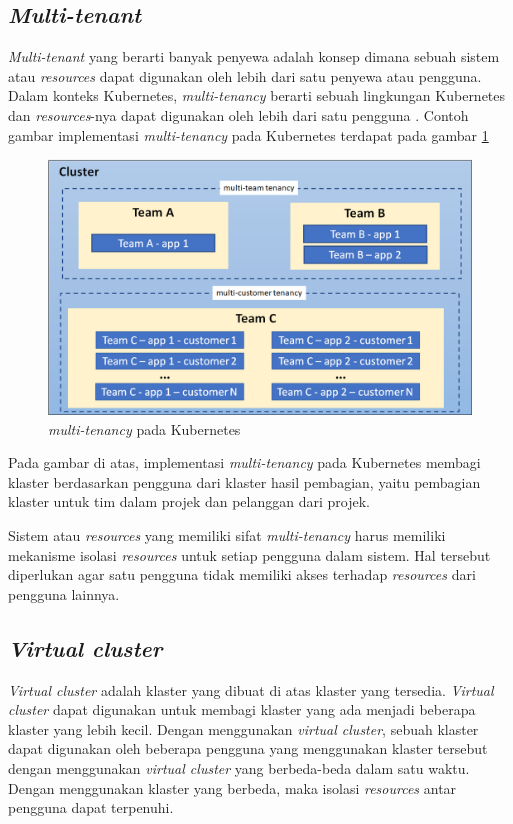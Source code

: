 \parencite{kubernetes-website-adding-linux-node}

\subsection{\emph{Multi-tenant}}

\emph{Multi-tenant} yang berarti banyak penyewa adalah konsep dimana sebuah sistem
atau \emph{resources} dapat digunakan oleh lebih dari satu penyewa atau pengguna. Dalam
konteks Kubernetes, \emph{multi-tenancy} berarti sebuah lingkungan Kubernetes dan \emph{resources}-nya
dapat digunakan oleh lebih dari satu pengguna \parencite{oliva_multi-tenancy_2024}. Contoh gambar
implementasi \emph{multi-tenancy} pada Kubernetes terdapat pada gambar \ref{fig:KubernetesMultiTenancy}

\begin{figure} [H] \centering
  \includegraphics[scale=0.7]{gambar/multi-tenancy.png}
  \caption{\emph{multi-tenancy} pada Kubernetes \parencite{kubernetes-website-multi-tenancy}}
  \label{fig:KubernetesMultiTenancy}
\end{figure}

Pada gambar di atas, implementasi \emph{multi-tenancy} pada Kubernetes
membagi klaster berdasarkan pengguna dari klaster hasil pembagian, yaitu pembagian
klaster untuk tim dalam projek dan pelanggan dari projek.

Sistem atau \emph{resources} yang memiliki sifat \emph{multi-tenancy} harus memiliki
mekanisme isolasi \emph{resources} untuk setiap pengguna dalam sistem. Hal tersebut
diperlukan agar satu pengguna tidak memiliki akses terhadap \emph{resources} dari
pengguna lainnya.

\subsection{\emph{Virtual cluster}}

\emph{Virtual cluster} adalah klaster yang dibuat di atas klaster yang tersedia.
\emph{Virtual cluster} dapat digunakan untuk membagi klaster yang ada menjadi beberapa
klaster yang lebih kecil. Dengan menggunakan \emph{virtual cluster}, sebuah klaster
dapat digunakan oleh beberapa pengguna yang menggunakan klaster tersebut dengan
menggunakan \emph{virtual cluster} yang berbeda-beda dalam satu waktu. Dengan
menggunakan klaster yang berbeda, maka isolasi \emph{resources} antar pengguna
dapat terpenuhi.
